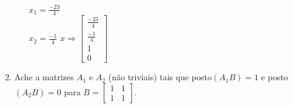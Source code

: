 \documentclass[leqno]{article}
\numberwithin{equation}{section}
\begin{document}
\begin{enumerate}
\begin{enumerate}
\begin{sol}
				\newline
				$x_1 = \frac{-23}{4}$\\
				\newline
				$x_2 = \frac{-1}{4}$
				\newline
				\newline
				$x \Rightarrow \begin{bmatrix} 
				\frac{-23}{4} \\
				\frac{-1}{4} \\
				1 \\
				0 \end{bmatrix}$
			\end{sol} 
		\end{enumerate}
		
		\item Ache a matrizes $A_1$ e $A_2$ (não triviais) tais que posto$(A_1B) = 1$ e posto$(A_2B) = 0$ para $B = \begin{bmatrix}1 & 1 \\ 1 & 1 \end{bmatrix}$.
		

\end{enumerate}
\end{document}

